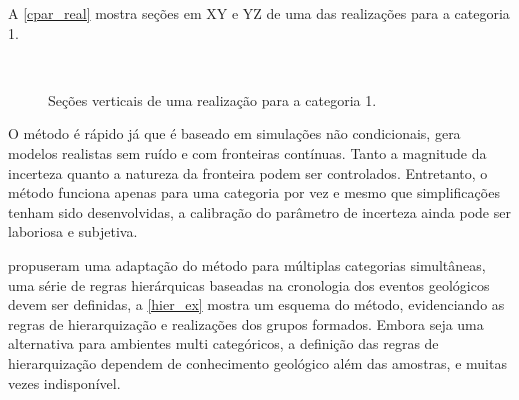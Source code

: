 A \autoref{cpar_real} mostra seções em XY e YZ de uma das realizações para a categoria 1.

\begin{figure}[t]
\caption{Seções verticais de uma realização para a categoria 1.} 
\label{cpar_real}
\begin{center}
\\
\end{center}
\begin{center}
\end{center}
\end{figure}

O método é rápido já que é baseado em simulações não condicionais, gera modelos realistas sem ruído e com fronteiras contínuas. Tanto a magnitude da incerteza quanto a natureza da fronteira podem ser controlados. Entretanto, o método funciona apenas para uma categoria por vez e mesmo que simplificações tenham sido desenvolvidas, a calibração do parâmetro de incerteza ainda pode ser laboriosa e subjetiva.

 propuseram uma adaptação  do método para múltiplas categorias simultâneas, uma série de regras hierárquicas baseadas na cronologia dos eventos geológicos devem ser definidas, a \autoref{hier_ex} mostra um esquema do método, evidenciando as regras de hierarquização e realizações dos grupos formados. Embora seja uma alternativa para ambientes multi categóricos, a definição das regras de hierarquização dependem de conhecimento geológico além das amostras, e muitas vezes indisponível.

